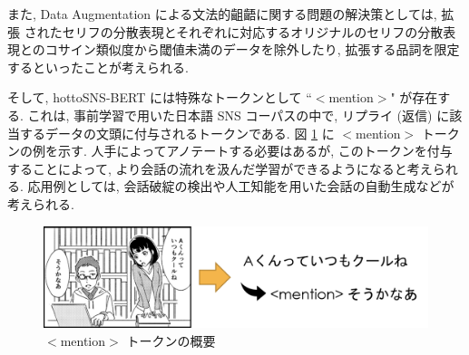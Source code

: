 \begin{table}[!h]
\vspace{20mm}
\caption{Data Augmentation による文法的齟齬}
\label{table:sogo}
\centering
{}
\vspace{10mm}
\end{table}

\newpage

また, Data Augmentation による文法的齟齬に関する問題の解決策としては, 拡張
されたセリフの分散表現とそれぞれに対応するオリジナルのセリフの分散表現とのコサイン類似度から閾値未満のデータを除外したり, 拡張する品詞を限定するといったことが考えられる.

そして, hottoSNS-BERT には特殊なトークンとして ``$<$mention$>$" が存在する. これは, 事前学習で用いた日本語 SNS コーパスの中で, リプライ (返信) に該当するデータの文頭に付与されるトークンである. 図 \ref{fig:mention} に $<$mention$>$ トークンの例を示す. 人手によってアノテートする必要はあるが, このトークンを付与することによって, より会話の流れを汲んだ学習ができるようになると考えられる. 応用例としては, 会話破綻の検出や人工知能を用いた会話の自動生成などが考えられる.

\begin{figure}[!h]
  \vspace{20mm}
  \centering
  \includegraphics[width=1.0\hsize]{doc/figures/mention.png}
  \caption{$<$mention$>$ トークンの概要}
  \label{fig:mention}
\end{figure}

